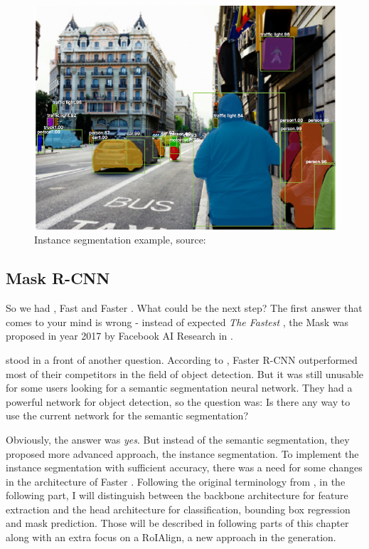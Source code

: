 \begin{figure}[H]
   \centering
	\includegraphics[width=0.8\linewidth]{./pictures/instance-segmentation.png}
	\caption[Instance segmentation example]{Instance segmentation example, source: 
\cite{mask-rcnn}}
      \label{fig:instance-segmentation}
\end{figure}

\subsection{Mask R-CNN}
\label{mask-rcnn}

So we had , Fast  and Faster . What could be the 
next step? The first answer that comes to your mind is wrong - instead of 
expected \textit{The Fastest }, the Mask  was proposed in 
year 2017 by Facebook AI Research  in \cite{mask-rcnn}.

 stood in a front of another question. According to \cite{faster-rcnn}, 
Faster R-CNN outperformed most of their competitors in the field of object 
detection. But it was still unusable for some users looking for a semantic 
segmentation neural network. They had a powerful network for object detection, 
so the question was: Is there any way to use the current network for the 
semantic segmentation?

Obviously, the answer was \textit{yes}. But instead of the semantic 
segmentation, they proposed more advanced approach, the instance segmentation. 
To implement the instance segmentation with sufficient accuracy, there was a 
need for some changes in the architecture of Faster . Following the 
original terminology from \cite{mask-rcnn}, in the following part, I will 
distinguish between the backbone architecture for feature extraction and the 
head architecture for classification, bounding box regression and mask 
prediction. Those will be described in following parts of this chapter along 
with an extra focus on a RoIAlign, a new approach in the  generation.

